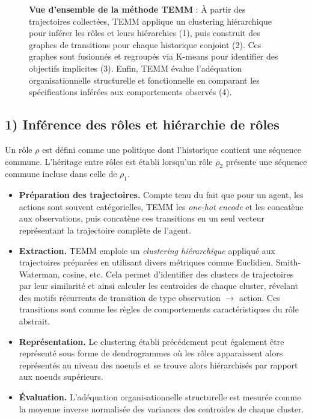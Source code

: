 \documentclass[francais,ROIA,Unicode,manuscript]{cedram}
\begin{document}
\begin{figure*}
    \centering
    \resizebox{\textwidth}{!}{%
        
    }
    \caption{\textbf{Vue d'ensemble de la méthode TEMM} : À partir des trajectoires collectées, TEMM applique un clustering hiérarchique pour inférer les rôles et leurs hiérarchies (1), puis construit des graphes de transitions pour chaque historique conjoint (2). Ces graphes sont fusionnés et regroupés via K-means pour identifier des objectifs implicites (3). Enfin, TEMM évalue l'adéquation organisationnelle structurelle et fonctionnelle en comparant les spécifications inférées aux comportements observés (4).}
    \label{fig:temm_overview}
\end{figure*}


\subsection*{1) Inférence des rôles et hiérarchie de rôles}
Un rôle \(\rho\) est défini comme une politique dont l’historique contient une séquence commune. L’héritage entre rôles est établi lorsqu’un rôle \(\rho_2\) présente une séquence commune incluse dans celle de \(\rho_1\).
\begin{itemize}
    \item \textbf{Préparation des trajectoires.} Compte tenu du fait que pour un agent, les actions sont souvent catégorielles, TEMM les \textit{one-hot encode} et les concatène aux observations, puis concatène ces transitions en un seul vecteur représentant la trajectoire complète de l'agent.
    \item \textbf{Extraction.} TEMM emploie un \textit{clustering hiérarchique} appliqué aux trajectoires préparées en utilisant divers métriques comme Euclidien, Smith-Waterman, cosine, etc. Cela permet d'identifier des clusters de trajectoires par leur similarité et ainsi calculer les centroides de chaque cluster, révelant des motifs récurrents de transition de type observation $\rightarrow$ action. Ces transitions sont comme les règles de comportements caractéristiques du rôle abstrait.
    \item \textbf{Représentation.} Le clustering établi précédement peut également être représenté sous forme de dendrogrammes où les rôles apparaissent alors représentés au niveau des noeuds et se trouve alors hiérarchisés par rapport aux noeuds supérieurs.
    \item \textbf{Évaluation.} L’adéquation organisationnelle structurelle est mesurée comme la moyenne inverse normalisée des variances des centroides de chaque cluster.
\end{itemize}
\end{document}
